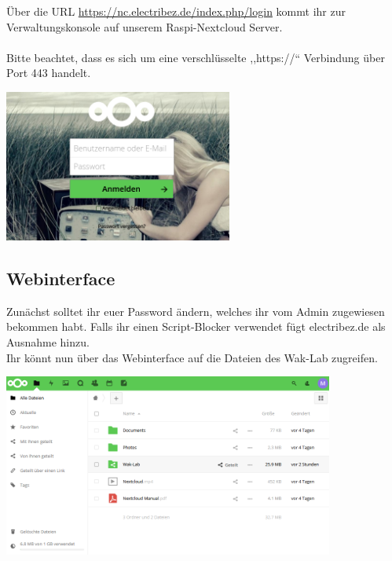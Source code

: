 Über die URL \url{https://nc.electribez.de/index.php/login} kommt ihr zur Verwaltungskonsole auf unserem Raspi-Nextcloud Server. \\
\ \\
Bitte beachtet, dass es sich um eine verschlüsselte ,,https://`` Verbindung über Port 443 handelt.\\

\begin{minipage}[t]{\textwidth}
  \centering
  \includegraphics[height=5cm]{pictures/Nextcloudlogin.png}
  \label{img:Nextcloudlogin}
\end{minipage}

\subsection{Webinterface}
Zunächst solltet ihr euer Password ändern, welches ihr vom Admin zugewiesen bekommen habt. Falls ihr einen Script-Blocker verwendet fügt electribez.de als Ausnahme hinzu.\\
Ihr könnt nun über das Webinterface auf die Dateien des Wak-Lab zugreifen.\\
 
\begin{minipage}[t]{\textwidth}
  \centering
  \includegraphics[height=6cm]{pictures/NextcloudWebinterface.png}
  \label{img:NextcloudWebinterface}
\end{minipage}


